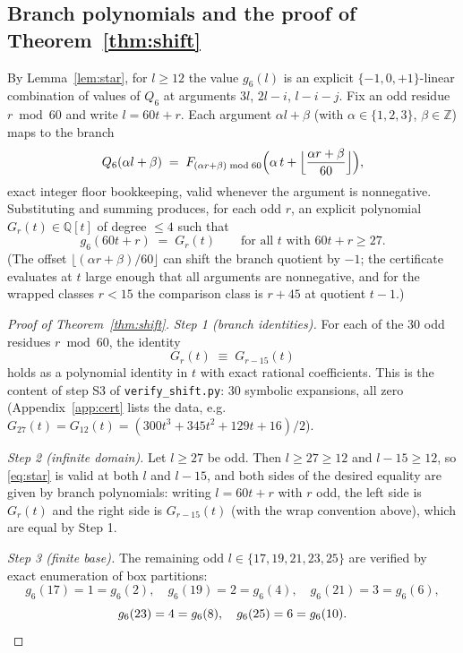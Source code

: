 \documentclass[11pt,reqno]{article}
\theoremstyle{definition}
\begin{document}
\subsection{Branch polynomials and the proof of Theorem~\ref{thm:shift}}
By Lemma~\ref{lem:star}, for $l\ge12$ the value $g_6(l)$ is an explicit $\{-1,0,+1\}$-linear combination of values of $Q_6$ at arguments $3l$, $2l-i$, $l-i-j$. Fix an odd residue $r\bmod 60$ and write $l=60t+r$. Each argument $\alpha l+\beta$ (with $\alpha\in\{1,2,3\}$, $\beta\in\mathbb Z$) maps to the branch
\[
Q_6(\alpha l+\beta)\;=\;F_{(\alpha r+\beta)\bmod 60}\Bigl(\alpha\,t+\Bigl\lfloor\frac{\alpha r+\beta}{60}\Bigr\rfloor\Bigr),
\]
exact integer floor bookkeeping, valid whenever the argument is nonnegative. Substituting and summing produces, for each odd $r$, an explicit polynomial $G_r(t)\in\mathbb Q[t]$ of degree $\le 4$ such that
\[
g_6(60t+r)\;=\;G_r(t)\qquad\text{for all } t \text{ with } 60t+r\ge 27 .
\]
(The offset $\lfloor(\alpha r+\beta)/60\rfloor$ can shift the branch quotient by $-1$; the certificate evaluates at $t$ large enough that all arguments are nonnegative, and for the wrapped classes $r<15$ the comparison class is $r+45$ at quotient $t-1$.)

\begin{proof}[Proof of Theorem~\ref{thm:shift}]
\emph{Step 1 (branch identities).} For each of the $30$ odd residues $r\bmod 60$, the identity
\begin{equation}\label{eq:branch}
G_r(t)\;\equiv\;G_{r-15}(t)
\end{equation}
holds as a polynomial identity in $t$ with exact rational coefficients. This is the content of step S3 of \texttt{verify\_shift.py}: $30$ symbolic expansions, all zero (Appendix~\ref{app:cert} lists the data, e.g.\ $G_{27}(t)=G_{12}(t)=(300t^3+345t^2+129t+16)/2$).

\emph{Step 2 (infinite domain).} Let $l\ge 27$ be odd. Then $l\ge27\ge12$ and $l-15\ge12$, so \eqref{eq:star} is valid at both $l$ and $l-15$, and both sides of the desired equality are given by branch polynomials: writing $l=60t+r$ with $r$ odd, the left side is $G_r(t)$ and the right side is $G_{r-15}(t)$ (with the wrap convention above), which are equal by Step 1.

\emph{Step 3 (finite base).} The remaining odd $l\in\{17,19,21,23,25\}$ are verified by exact enumeration of box partitions:
\[
g_6(17)=1=g_6(2),\quad g_6(19)=2=g_6(4),\quad g_6(21)=3=g_6(6),
\]
\[
g_6(23)=4=g_6(8),\quad g_6(25)=6=g_6(10).\qedhere
\]
\end{proof}
\end{document}
